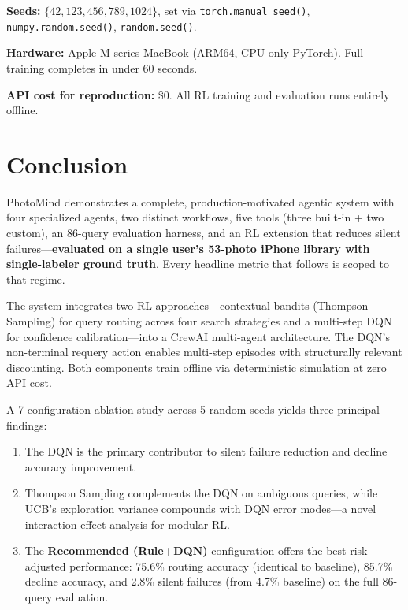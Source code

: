 \documentclass[11pt,letterpaper]{article}
\begin{document}
\textbf{Seeds:} $\{42, 123, 456, 789, 1024\}$, set via \texttt{torch.manual\_seed()}, \texttt{numpy.random.seed()}, \texttt{random.seed()}.

\textbf{Hardware:} Apple M-series MacBook (ARM64, CPU-only PyTorch). Full training completes in under 60 seconds.

\textbf{API cost for reproduction:} \$0. All RL training and evaluation runs entirely offline.

\section{Conclusion}
\label{sec:conclusion}

PhotoMind demonstrates a complete, production-motivated agentic system with four specialized agents, two distinct workflows, five tools (three built-in + two custom), an 86-query evaluation harness, and an RL extension that reduces silent failures---\textbf{evaluated on a single user's 53-photo iPhone library with single-labeler ground truth}. Every headline metric that follows is scoped to that regime.

The system integrates two RL approaches---contextual bandits (Thompson Sampling) for query routing across four search strategies and a multi-step DQN for confidence calibration---into a CrewAI multi-agent architecture. The DQN's non-terminal requery action enables multi-step episodes with structurally relevant discounting. Both components train offline via deterministic simulation at zero API cost.

A 7-configuration ablation study across 5 random seeds yields three principal findings:

\begin{enumerate}
  \item The DQN is the primary contributor to silent failure reduction and decline accuracy improvement.
  \item Thompson Sampling complements the DQN on ambiguous queries, while UCB's exploration variance compounds with DQN error modes---a novel interaction-effect analysis for modular RL.
  \item The \textbf{Recommended (Rule+DQN)} configuration offers the best risk-adjusted performance: 75.6\% routing accuracy (identical to baseline), 85.7\% decline accuracy, and 2.8\% silent failures (from 4.7\% baseline) on the full 86-query evaluation.
\end{enumerate}
\end{document}

